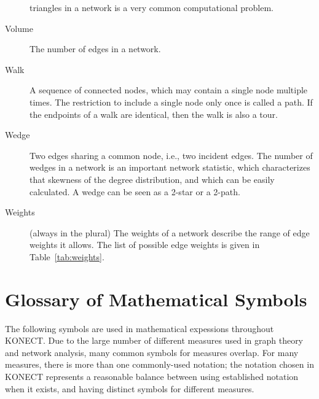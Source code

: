 \documentclass{article}
\begin{document}
\begin{description}
    triangles in a network is a very common computational problem.  
  \item[Volume]
    The number of edges in a network.  
  \item[Walk]
    A sequence of connected nodes, which may contain a single node
    multiple times.  The restriction to include a single node only once
    is called a path.  If the endpoints of a walk are identical, then
    the walk is also a tour.  
  \item[Wedge] 
    Two edges sharing a common node, i.e., two incident edges.  The
    number of wedges in a network is an important network statistic,
    which characterizes that skewness of the degree distribution, and
    which can be easily calculated.  A wedge can be seen as a 2-star or
    a 2-path.  
  \item[Weights] (always in the plural)
    The weights of a network describe the range of edge weights it
    allows.  The list of possible edge weights is given in
    Table~\ref{tab:weights}.  
\end{description}

\section{Glossary of Mathematical Symbols}

The following symbols are used in mathematical expessions throughout
KONECT.  Due to the large number of different measures used in graph
theory and network analysis, many common symbols for measures overlap.
For many measures, there is more than one commonly-used notation; the
notation chosen in KONECT represents a reasonable balance between using established
notation when it exists, and having distinct symbols for different
measures. \\
\end{document}
